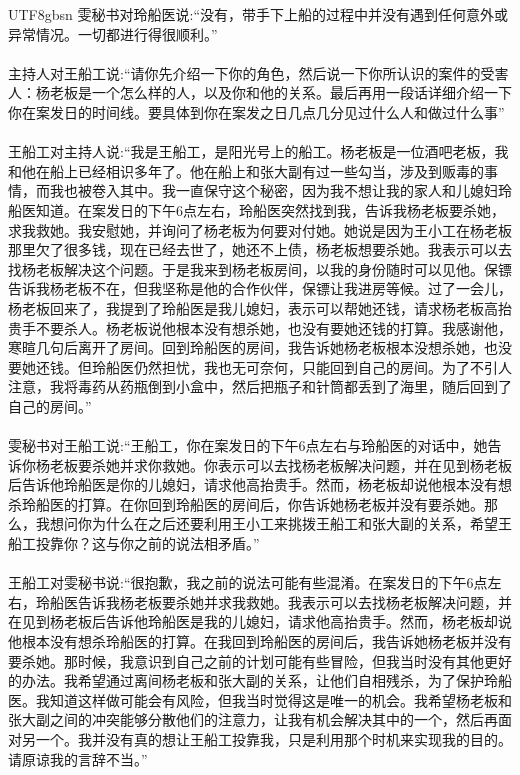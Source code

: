 \documentclass[11pt]{article}
\begin{document}
{\begin{CJK}{UTF8}{gbsn}
雯秘书对玲船医说:``没有，带手下上船的过程中并没有遇到任何意外或异常情况。一切都进行得很顺利。''\\ \\
主持人对王船工说:``请你先介绍一下你的角色，然后说一下你所认识的案件的受害人：杨老板是一个怎么样的人，以及你和他的关系。最后再用一段话详细介绍一下你在案发日的时间线。要具体到你在案发之日几点几分见过什么人和做过什么事''\\ \\
王船工对主持人说:``我是王船工，是阳光号上的船工。杨老板是一位酒吧老板，我和他在船上已经相识多年了。他在船上和张大副有过一些勾当，涉及到贩毒的事情，而我也被卷入其中。我一直保守这个秘密，因为我不想让我的家人和儿媳妇玲船医知道。在案发日的下午6点左右，玲船医突然找到我，告诉我杨老板要杀她，求我救她。我安慰她，并询问了杨老板为何要对付她。她说是因为王小工在杨老板那里欠了很多钱，现在已经去世了，她还不上债，杨老板想要杀她。我表示可以去找杨老板解决这个问题。于是我来到杨老板房间，以我的身份随时可以见他。保镖告诉我杨老板不在，但我坚称是他的合作伙伴，保镖让我进房等候。过了一会儿，杨老板回来了，我提到了玲船医是我儿媳妇，表示可以帮她还钱，请求杨老板高抬贵手不要杀人。杨老板说他根本没有想杀她，也没有要她还钱的打算。我感谢他，寒暄几句后离开了房间。回到玲船医的房间，我告诉她杨老板根本没想杀她，也没要她还钱。但玲船医仍然担忧，我也无可奈何，只能回到自己的房间。为了不引人注意，我将毒药从药瓶倒到小盒中，然后把瓶子和针筒都丢到了海里，随后回到了自己的房间。''\\ \\
雯秘书对王船工说:``王船工，你在案发日的下午6点左右与玲船医的对话中，她告诉你杨老板要杀她并求你救她。你表示可以去找杨老板解决问题，并在见到杨老板后告诉他玲船医是你的儿媳妇，请求他高抬贵手。然而，杨老板却说他根本没有想杀玲船医的打算。在你回到玲船医的房间后，你告诉她杨老板并没有要杀她。那么，我想问你为什么在之后还要利用王小工来挑拨王船工和张大副的关系，希望王船工投靠你？这与你之前的说法相矛盾。''\\ \\
王船工对雯秘书说:``很抱歉，我之前的说法可能有些混淆。在案发日的下午6点左右，玲船医告诉我杨老板要杀她并求我救她。我表示可以去找杨老板解决问题，并在见到杨老板后告诉他玲船医是我的儿媳妇，请求他高抬贵手。然而，杨老板却说他根本没有想杀玲船医的打算。在我回到玲船医的房间后，我告诉她杨老板并没有要杀她。那时候，我意识到自己之前的计划可能有些冒险，但我当时没有其他更好的办法。我希望通过离间杨老板和张大副的关系，让他们自相残杀，为了保护玲船医。我知道这样做可能会有风险，但我当时觉得这是唯一的机会。我希望杨老板和张大副之间的冲突能够分散他们的注意力，让我有机会解决其中的一个，然后再面对另一个。我并没有真的想让王船工投靠我，只是利用那个时机来实现我的目的。请原谅我的言辞不当。''\\ \\

\end{CJK}}
\end{document}

